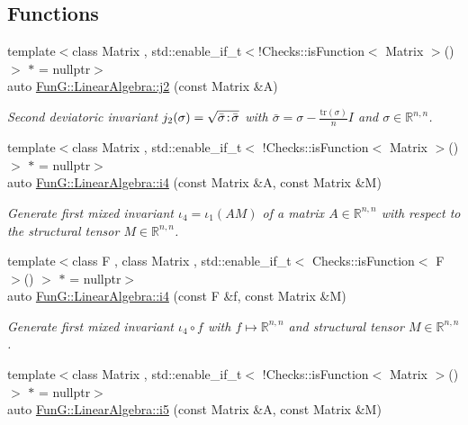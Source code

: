 \subsection*{Functions}
\begin{DoxyCompactItemize}
\item 
{\footnotesize template$<$class Matrix , std\+::enable\+\_\+if\+\_\+t$<$!\+Checks\+::is\+Function$<$ Matrix $>$()$>$ $\ast$  = nullptr$>$ }\\auto \hyperlink{group__InvariantGroup_ga9a2bc859fe1ae34b1a3ada91a39d69df}{Fun\+G\+::\+Linear\+Algebra\+::j2} (const Matrix \&A)
\begin{DoxyCompactList}\small\item\em Second deviatoric invariant $ j_2(\sigma)=\sqrt{\bar\sigma\negthinspace:\negthinspace\bar\sigma} $ with $\bar\sigma = \sigma - \frac{\mathrm{tr}(\sigma)}{n}I$ and $\sigma\in\mathbb{R}^{n,n}$. \end{DoxyCompactList}\item 
{\footnotesize template$<$class Matrix , std\+::enable\+\_\+if\+\_\+t$<$ !\+Checks\+::is\+Function$<$ Matrix $>$() $>$ $\ast$  = nullptr$>$ }\\auto \hyperlink{group__InvariantGroup_ga1898785172ecce11af0c27e54d555009}{Fun\+G\+::\+Linear\+Algebra\+::i4} (const Matrix \&A, const Matrix \&M)
\begin{DoxyCompactList}\small\item\em Generate first mixed invariant $ \iota_4=\iota_1(AM) $ of a matrix $A\in\mathbb{R}^{n,n}$ with respect to the structural tensor $M\in\mathbb{R}^{n,n}$. \end{DoxyCompactList}\item 
{\footnotesize template$<$class F , class Matrix , std\+::enable\+\_\+if\+\_\+t$<$ Checks\+::is\+Function$<$ F $>$() $>$ $\ast$  = nullptr$>$ }\\auto \hyperlink{group__InvariantGroup_ga0df96cdb1e4b8b5a040f2adc97c51100}{Fun\+G\+::\+Linear\+Algebra\+::i4} (const F \&f, const Matrix \&M)
\begin{DoxyCompactList}\small\item\em Generate first mixed invariant $ \iota_4\circ f $ with $f\mapsto\mathbb{R}^{n,n}$ and structural tensor $M\in\mathbb{R}^{n,n}$. \end{DoxyCompactList}\item 
{\footnotesize template$<$class Matrix , std\+::enable\+\_\+if\+\_\+t$<$ !\+Checks\+::is\+Function$<$ Matrix $>$() $>$ $\ast$  = nullptr$>$ }\\auto \hyperlink{group__InvariantGroup_gabedc42182203d883278e29fd16b355a0}{Fun\+G\+::\+Linear\+Algebra\+::i5} (const Matrix \&A, const Matrix \&M)

\end{DoxyCompactItemize}
